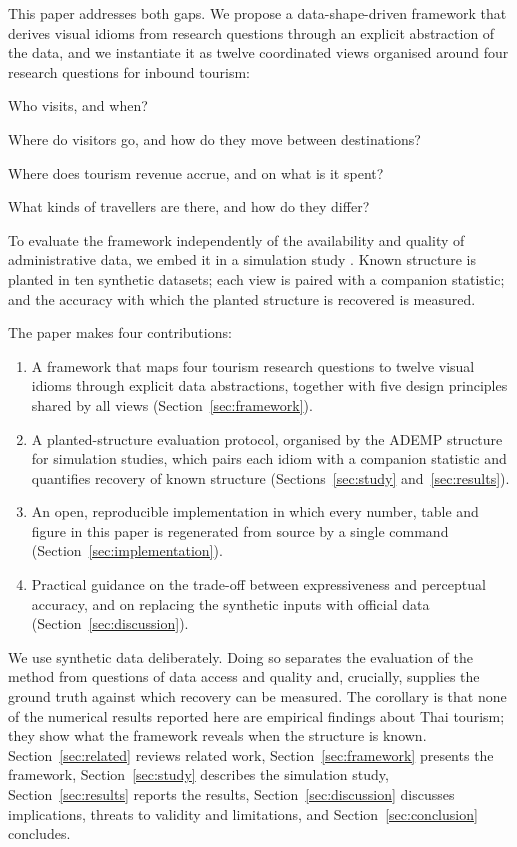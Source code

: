 \documentclass[11pt,a4paper]{article}
\begin{document}
This paper addresses both gaps. We propose a data-shape-driven framework that derives visual idioms from
research questions through an explicit abstraction of the data, and we instantiate it as twelve coordinated
views organised around four research questions for inbound tourism:
\begin{description}[leftmargin=3.2em,labelwidth=2.6em,itemsep=1pt]
  \item[RQ1] Who visits, and when?
  \item[RQ2] Where do visitors go, and how do they move between destinations?
  \item[RQ3] Where does tourism revenue accrue, and on what is it spent?
  \item[RQ4] What kinds of travellers are there, and how do they differ?
\end{description}
To evaluate the framework independently of the availability and quality of administrative data, we embed
it in a simulation study \citep{morris2019}. Known structure is planted in ten synthetic datasets; each view
is paired with a companion statistic; and the accuracy with which the planted structure is recovered is
measured.

The paper makes four contributions:
\begin{enumerate}[label=(C\arabic*),leftmargin=3em]
  \item A framework that maps four tourism research questions to twelve visual idioms through explicit data
        abstractions, together with five design principles shared by all views (Section~\ref{sec:framework}).
  \item A planted-structure evaluation protocol, organised by the ADEMP structure for simulation studies, which
        pairs each idiom with a companion statistic and quantifies recovery of known structure
        (Sections~\ref{sec:study} and~\ref{sec:results}).
  \item An open, reproducible implementation in which every number, table and figure in this paper is
        regenerated from source by a single command (Section~\ref{sec:implementation}).
  \item Practical guidance on the trade-off between expressiveness and perceptual accuracy, and on replacing
        the synthetic inputs with official data (Section~\ref{sec:discussion}).
\end{enumerate}

We use synthetic data deliberately. Doing so separates the evaluation of the method from questions of data
access and quality and, crucially, supplies the ground truth against which recovery can be measured. The
corollary is that none of the numerical results reported here are empirical findings about Thai tourism;
they show what the framework reveals when the structure is known. Section~\ref{sec:related} reviews related
work, Section~\ref{sec:framework} presents the framework, Section~\ref{sec:study} describes the simulation
study, Section~\ref{sec:results} reports the results, Section~\ref{sec:discussion} discusses implications,
threats to validity and limitations, and Section~\ref{sec:conclusion} concludes.
\end{document}
